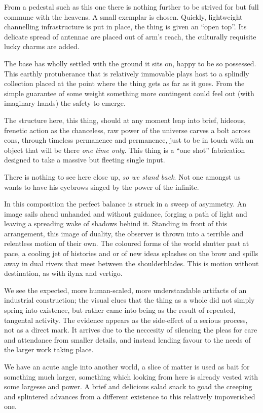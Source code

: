 \documentclass{book}
\begin{document}
From a pedestal such as this one there is nothing further to be strived for but
full commune with the heavens. A small exemplar is chosen. Quickly, lightweight
channelling infrastructure is put in place, the thing is given an ``open top''.
Its delicate spread of antennae are placed out of arm's reach, the culturally
requisite lucky charms are added.

The base has wholly settled with the ground it sits on, happy to be so
possessed. This earthly protuberance that is relatively immovable plays host to
a splindly collection placed at the point where the thing gets as far as it
goes. From the simple guarantee of some weight something more contingent could
feel out (with imaginary hands) the safety to emerge.

The structure here, this thing, should at any moment leap into brief, hideous,
frenetic action as the chanceless, raw power of the universe carves a bolt
across eons, through timeless permanence and permanence, just to be in touch
with an object that will be there \emph{one time only}. This thing is a ``one
shot'' fabrication designed to take a massive but fleeting single input.

There is nothing to see here close up, \emph{so we stand back}. Not one amongst
us wants to have his eyebrows singed by the power of the infinite.

In this composition the perfect balance is struck in a sweep of asymmetry. An
image sails ahead unhanded and without guidance, forging a path of light and
leaving a spreading wake of shadows behind it. Standing in front of this
arrangement, this image of duality, the observer is thrown into a terrible and
relentless motion of their own. The coloured forms of the world shutter past at
pace, a cooling jet of histories and or of new ideas splashes on the brow and
spills away in dual rivers that meet between the shoulderblades. This is motion
without destination, as with ilynx and vertigo.

We see the expected, more human-scaled, more understandable artifacts of an
industrial construction; the visual clues that the thing as a whole did not
simply spring into existence, but rather came into being as the result of
repeated, tangental activity. The evidence appears as the side-effect of a
serious process, not as a direct mark. It arrives due to the neccesity of
silencing the pleas for care and attendance from smaller details, and instead
lending favour to the needs of the larger work taking place.

We have an acute angle into another world, a slice of matter is used as bait
for something much larger, something which looking from here is already vested
with some largesse and power. A brief and delicious salad snack to goad the
creeping and splintered advances from a different existence to this relatively
impoverished one.
\end{document}
